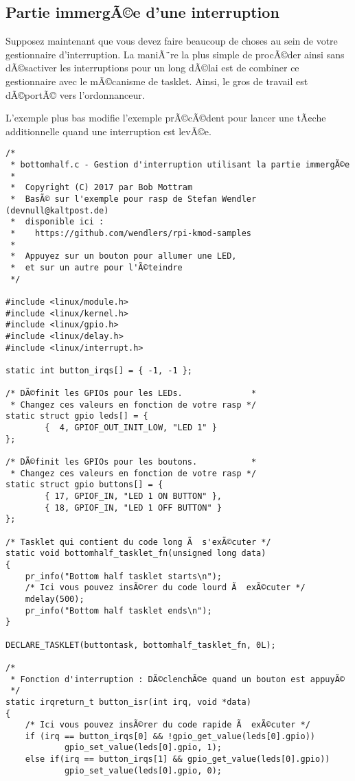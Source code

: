 \documentclass[11pt]{article}
\begin{document}
\subsection*{Partie immergÃ©e d'une interruption}
\label{sec-15-3}

Supposez maintenant que vous devez faire beaucoup de choses au sein de votre gestionnaire d'interruption. La maniÃ¨re la plus simple de procÃ©der ainsi sans dÃ©sactiver les interruptions pour un long dÃ©lai est de combiner ce gestionnaire avec le mÃ©canisme de tasklet. Ainsi, le gros de travail est dÃ©portÃ© vers l'ordonnanceur.

L'exemple plus bas modifie l'exemple prÃ©cÃ©dent pour lancer une tÃ¢che additionnelle quand une interruption est levÃ©e.

\begin{verbatim}
/*
 * bottomhalf.c - Gestion d'interruption utilisant la partie immergÃ©e
 *
 *  Copyright (C) 2017 par Bob Mottram
 *  BasÃ© sur l'exemple pour rasp de Stefan Wendler (devnull@kaltpost.de)
 *  disponible ici :
 *    https://github.com/wendlers/rpi-kmod-samples
 *
 *  Appuyez sur un bouton pour allumer une LED,
 *  et sur un autre pour l'Ã©teindre
 */

#include <linux/module.h>
#include <linux/kernel.h>
#include <linux/gpio.h>
#include <linux/delay.h>
#include <linux/interrupt.h>

static int button_irqs[] = { -1, -1 };

/* DÃ©finit les GPIOs pour les LEDs.              *
 * Changez ces valeurs en fonction de votre rasp */
static struct gpio leds[] = {
        {  4, GPIOF_OUT_INIT_LOW, "LED 1" }
};

/* DÃ©finit les GPIOs pour les boutons.           *
 * Changez ces valeurs en fonction de votre rasp */
static struct gpio buttons[] = {
        { 17, GPIOF_IN, "LED 1 ON BUTTON" },
        { 18, GPIOF_IN, "LED 1 OFF BUTTON" }
};

/* Tasklet qui contient du code long Ã  s'exÃ©cuter */
static void bottomhalf_tasklet_fn(unsigned long data)
{
    pr_info("Bottom half tasklet starts\n");
    /* Ici vous pouvez insÃ©rer du code lourd Ã  exÃ©cuter */
    mdelay(500);
    pr_info("Bottom half tasklet ends\n");
}

DECLARE_TASKLET(buttontask, bottomhalf_tasklet_fn, 0L);

/*
 * Fonction d'interruption : DÃ©clenchÃ©e quand un bouton est appuyÃ©
 */
static irqreturn_t button_isr(int irq, void *data)
{
    /* Ici vous pouvez insÃ©rer du code rapide Ã  exÃ©cuter */
    if (irq == button_irqs[0] && !gpio_get_value(leds[0].gpio))
            gpio_set_value(leds[0].gpio, 1);
    else if(irq == button_irqs[1] && gpio_get_value(leds[0].gpio))
            gpio_set_value(leds[0].gpio, 0);


\end{verbatim}
\end{document}
